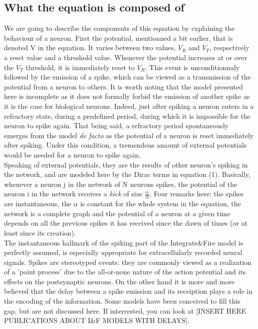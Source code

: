 \documentclass{report}
\begin{document}
\subsection{What the equation is composed of}
	We are going to describe the components of this equation by explaining the behaviour of a neuron. First the potential, mentionned a bit earlier, that is denoted V in the equation. It varies between two values, $V_R$ and $V_T$, respectively a reset value and a threshold value. Whenever the potential increases at or over the $V_T$ threshold, it is immediately reset to $V_R$. This event is unconditionnaly followed by the emission of a spike, which can be viewed as a transmission of the potential from a neuron to others. It is worth noting that the model presented here is incomplete as it does not formally forbid the emission of another spike as it is the case for biological neurons. Indeed, just after spiking a neuron enters in a refractory state, during a predefined period, during which it is impossible for the neuron to spike again. That being said, a refractory period spontaneously emerges from the model \emph{de facto} as the potential of a neuron is reset immediately after spiking. Under this condition, a tremendous amount of external potentials would be needed for a neuron to spike again.\\
	Speaking of external potentials, they are the results of other neuron's spiking in the network, and are modeled here by the Dirac terms in equation (1). Basically, whenever a neuron j in the network of N neurons spikes, the potential of the neuron i in the network receives a \emph{kick} of size $\frac{\alpha}{N}$. Four remarks here: the spikes are instantaneous, the $\alpha$ is constant for the whole system in the equation, the network is a complete graph and the potential of a neuron at a given time depends on all the previous spikes it has received since the dawn of times (or at least since its creation).\\
	The instantaneous hallmark of the spiking part of the Integrate\&Fire model is perfectly assumed, is especially appropriate for extracellularly recorded neural signals. Spikes are stereotyped events: they are commonly viewed as a realization of a 'point process' due to the all-or-none nature of the action potential and its effects on the postsynaptic neurons. On the other hand it is more and more believed that the delay between a spike emission and its receiption plays a role in the encoding of the information. Some models have been conceived to fill this gap, but are not discussed here. If interrested, you can look at [INSERT HERE PUBLICATIONS ABOUT I\&F MODELS WITH DELAYS].\\
\end{document}
